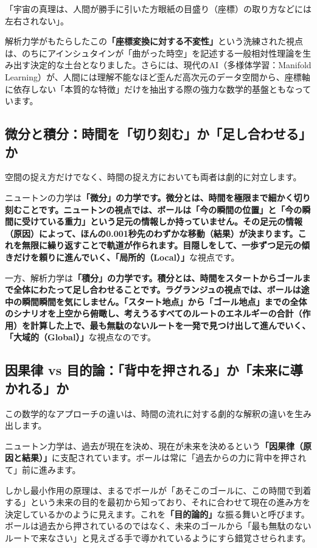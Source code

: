 「宇宙の真理は、人間が勝手に引いた方眼紙の目盛り（座標）の取り方などには左右されない」。

解析力学がもたらしたこの\textbf{「座標変換に対する不変性」}という洗練された視点は、のちにアインシュタインが「曲がった時空」を記述する一般相対性理論を生み出す決定的な土台となりました。さらには、現代のAI（多様体学習：Manifold Learning）が、人間には理解不能なほど歪んだ高次元のデータ空間から、座標軸に依存しない「本質的な特徴」だけを抽出する際の強力な数学的基盤ともなっています。

\subsection{微分と積分：時間を「切り刻む」か「足し合わせる」か}

空間の捉え方だけでなく、時間の捉え方においても両者は劇的に対立します。

ニュートンの力学は\textbf{「微分」の力学です。微分とは、時間を極限まで細かく切り刻むことです。ニュートンの視点では、ボールは「今の瞬間の位置」と「今の瞬間に受けている重力」という足元の情報しか持っていません。その足元の情報（原因）によって、ほんの0.001秒先のわずかな移動（結果）が決まります。これを無限に繰り返すことで軌道が作られます。目隠しをして、一歩ずつ足元の傾きだけを頼りに進んでいく、「局所的（Local）」}な視点です。

一方、解析力学は\textbf{「積分」の力学です。積分とは、時間をスタートからゴールまで全体にわたって足し合わせることです。ラグランジュの視点では、ボールは途中の瞬間瞬間を気にしません。「スタート地点」から「ゴール地点」までの全体のシナリオを上空から俯瞰し、考えうるすべてのルートのエネルギーの合計（作用）を計算した上で、最も無駄のないルートを一発で見つけ出して進んでいく、「大域的（Global）」}な視点なのです。

\subsection{因果律 vs 目的論：「背中を押される」か「未来に導かれる」か}

この数学的なアプローチの違いは、時間の流れに対する劇的な解釈の違いを生み出します。

ニュートン力学は、過去が現在を決め、現在が未来を決めるという\textbf{「因果律（原因と結果）」}に支配されています。ボールは常に「過去からの力に背中を押されて」前に進みます。

しかし最小作用の原理は、まるでボールが「あそこのゴールに、この時間で到着する」という未来の目的を最初から知っており、それに合わせて現在の進み方を決定しているかのように見えます。これを\textbf{「目的論的」}な振る舞いと呼びます。ボールは過去から押されているのではなく、未来のゴールから「最も無駄のないルートで来なさい」と見えざる手で導かれているようにすら錯覚させられます。

